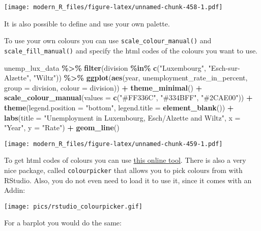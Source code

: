 \documentclass[
]{article}
\newenvironment{Shaded}{\begin{snugshade}}{\end{snugshade}}
\newcommand{\DataTypeTok}[1]{\textcolor[rgb]{0.13,0.29,0.53}{#1}}
\newcommand{\KeywordTok}[1]{\textcolor[rgb]{0.13,0.29,0.53}{\textbf{#1}}}
\newcommand{\NormalTok}[1]{#1}
\newcommand{\OperatorTok}[1]{\textcolor[rgb]{0.81,0.36,0.00}{\textbf{#1}}}
\newcommand{\StringTok}[1]{\textcolor[rgb]{0.31,0.60,0.02}{#1}}
\begin{document}
\texttt{[image: modern\_R\_files/figure-latex/unnamed-chunk-458-1.pdf]}

It is also possible to define and use your own palette.

To use your own colours you can use \texttt{scale\_colour\_manual()} and \texttt{scale\_fill\_manual()} and specify
the html codes of the colours you want to use.

\begin{Shaded}
\begin{Highlighting}[]
\NormalTok{unemp\_lux\_data }\OperatorTok{\%\textgreater{}\%}
\StringTok{  }\KeywordTok{filter}\NormalTok{(division }\OperatorTok{\%in\%}\StringTok{ }\KeywordTok{c}\NormalTok{(}\StringTok{"Luxembourg"}\NormalTok{, }\StringTok{"Esch{-}sur{-}Alzette"}\NormalTok{, }\StringTok{"Wiltz"}\NormalTok{)) }\OperatorTok{\%\textgreater{}\%}
\StringTok{  }\KeywordTok{ggplot}\NormalTok{(}\KeywordTok{aes}\NormalTok{(year, unemployment\_rate\_in\_percent, }\DataTypeTok{group =}\NormalTok{ division, }\DataTypeTok{colour =}\NormalTok{ division)) }\OperatorTok{+}
\StringTok{  }\KeywordTok{theme\_minimal}\NormalTok{() }\OperatorTok{+}
\StringTok{  }\KeywordTok{scale\_colour\_manual}\NormalTok{(}\DataTypeTok{values =} \KeywordTok{c}\NormalTok{(}\StringTok{"\#FF336C"}\NormalTok{, }\StringTok{"\#334BFF"}\NormalTok{, }\StringTok{"\#2CAE00"}\NormalTok{)) }\OperatorTok{+}
\StringTok{  }\KeywordTok{theme}\NormalTok{(}\DataTypeTok{legend.position =} \StringTok{"bottom"}\NormalTok{, }\DataTypeTok{legend.title =} \KeywordTok{element\_blank}\NormalTok{()) }\OperatorTok{+}
\StringTok{  }\KeywordTok{labs}\NormalTok{(}\DataTypeTok{title =} \StringTok{"Unemployment in Luxembourg, Esch/Alzette and Wiltz"}\NormalTok{, }\DataTypeTok{x =} \StringTok{"Year"}\NormalTok{, }\DataTypeTok{y =} \StringTok{"Rate"}\NormalTok{) }\OperatorTok{+}
\StringTok{  }\KeywordTok{geom\_line}\NormalTok{()}
\end{Highlighting}
\end{Shaded}

\texttt{[image: modern\_R\_files/figure-latex/unnamed-chunk-459-1.pdf]}

To get html codes of colours you can use \href{http://htmlcolorcodes.com/color-picker/}{this online
tool}.
There is also a very nice package, called \texttt{colourpicker} that allows you to
pick colours from with RStudio. Also, you do not even need to load it to use
it, since it comes with an Addin:

\texttt{[image: pics/rstudio\_colourpicker.gif]}

For a barplot you would do the same:
\end{document}
